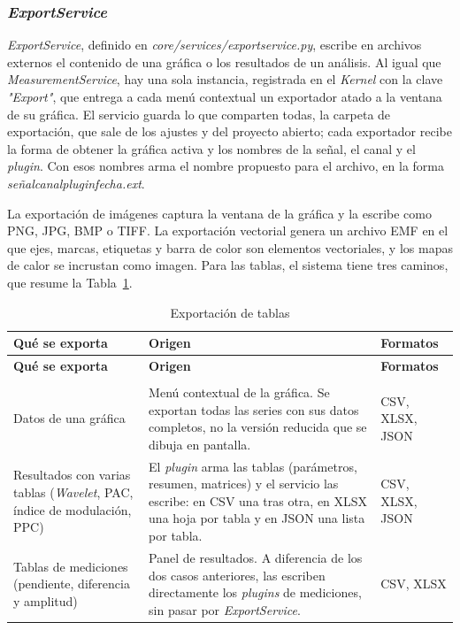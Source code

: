 \documentclass[12pt,letterpaper,oneside]{article}
\DeclareRobustCommand{\_}{\textunderscore\allowbreak}
\begin{document}
\subsubsection{\textit{ExportService}}
\label{sec:sdd_export}

\textit{ExportService}, definido en \textit{core/services/export\_service.py}, escribe en archivos externos el contenido de una gráfica o los resultados de un análisis. Al igual que \textit{MeasurementService}, hay una sola instancia, registrada en el \textit{Kernel} con la clave \textit{"Export"}, que entrega a cada menú contextual un exportador atado a la ventana de su gráfica. El servicio guarda lo que comparten todas, la carpeta de exportación, que sale de los ajustes y del proyecto abierto; cada exportador recibe la forma de obtener la gráfica activa y los nombres de la señal, el canal y el \textit{plugin}. Con esos nombres arma el nombre propuesto para el archivo, en la forma \textit{señal\_canal\_plugin\_fecha.ext}.

La exportación de imágenes captura la ventana de la gráfica y la escribe como PNG, JPG, BMP o TIFF. La exportación vectorial genera un archivo EMF en el que ejes, marcas, etiquetas y barra de color son elementos vectoriales, y los mapas de calor se incrustan como imagen. Para las tablas, el sistema tiene tres caminos, que resume la Tabla~\ref{tab:sdd_export_tablas}.

\begin{center}
\small
\begin{longtable}{|p{}|p{}|p{}|}
\hline
\textbf{Qué se exporta} & \textbf{Origen} & \textbf{Formatos} \\
\hline
\endfirsthead
\hline
\textbf{Qué se exporta} & \textbf{Origen} & \textbf{Formatos} \\
\hline
\endhead
\hline
\endfoot
\hline
\caption{Exportación de tablas} \label{tab:sdd_export_tablas} \\
\endlastfoot
Datos de una gráfica & Menú contextual de la gráfica. Se exportan todas las series con sus datos completos, no la versión reducida que se dibuja en pantalla. & CSV, XLSX, JSON \\
\hline
Resultados con varias tablas (\textit{Wavelet}, PAC, índice de modulación, PPC) & El \textit{plugin} arma las tablas (parámetros, resumen, matrices) y el servicio las escribe: en CSV una tras otra, en XLSX una hoja por tabla y en JSON una lista por tabla. & CSV, XLSX, JSON \\
\hline
Tablas de mediciones (pendiente, diferencia y amplitud) & Panel de resultados. A diferencia de los dos casos anteriores, las escriben directamente los \textit{plugins} de mediciones, sin pasar por \textit{ExportService}. & CSV, XLSX \\
\hline
\end{longtable}
\end{center}
\end{document}

